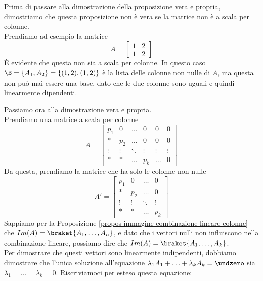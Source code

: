 \documentclass[11pt, a4paper, titlepage, oneside]{scrbook}
\begin{document}
\Dimostrazione \nopagebreak

Prima di passare alla dimostrazione della proposizione vera e propria, dimostriamo che questa proposizione non è vera se la matrice non è a scala per colonne. \\
Prendiamo ad esempio la matrice 
\[ A =
\begin{bmatrix}
1 & 2 \\
1 & 2
\end{bmatrix}
\]
È evidente che questa non sia a scala per colonne. In questo caso $\B = \{A_1, A_2\} = \{(1,2), (1,2)\}$ è la lista delle colonne non nulle di $A$, ma questa non può mai essere una base, dato che le due colonne sono uguali e quindi linearmente dipendenti. 

Passiamo ora alla dimostrazione vera e propria. \\
Prendiamo una matrice a scala per colonne
\[A = 
\begin{bmatrix}
p_1 & 0 & \dots & 0 & 0 & 0 \\ * & p_2 & \dots & 0 & 0 & 0\\ \vdots & \vdots & \ddots & \vdots &  \vdots &  \vdots \\ * & * & \dots & p_k & \dots & 0
\end{bmatrix}
\]
Da questa, prendiamo la matrice che ha solo le colonne non nulle
\[A' = 
\begin{bmatrix}
p_1 & 0 & \dots & 0  \\ * & p_2 & \dots & 0 \\ \vdots & \vdots & \ddots & \vdots \\ * & * & \dots & p_k  
\end{bmatrix}
\]
Sappiamo per la Proposizione \ref{propos-immagine-combinazione-lineare-colonne} che $Im(A) = \braket{A_1, \ldots, A_n}$, e dato che i vettori nulli non influiscono nella combinazione lineare, possiamo dire che $Im(A) = \braket{A_1, \ldots, A_k}$. \\
Per dimostrare che questi vettori sono linearmente indipendenti, dobbiamo dimostrare che l'unica soluzione all'equazione $\lambda_1 A_1 + \ldots + \lambda_k A_k = \undzero$ sia $\lambda_1 = \ldots = \lambda_k = 0$. Riscriviamoci per esteso questa equazione:
\end{document}
